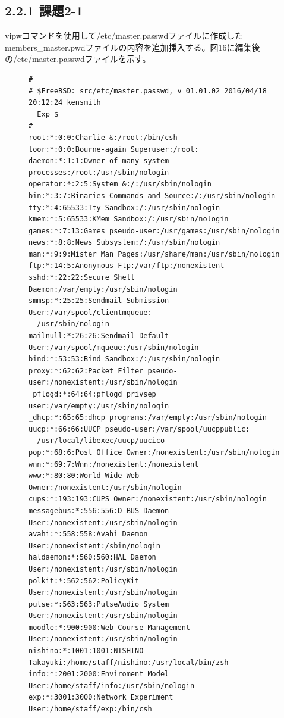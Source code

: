 \documentclass[12pt]{jreport}
\begin{document}
            \subsection*{2.2.1 課題2-1}
                vipwコマンドを使用して/etc/master.passwdファイルに作成したmembers\_master.pwdファイルの内容を追加挿入する。図16に編集後の/etc/master.passwdファイルを示す。
                \begin{figure}[H]
                    \begin{center}
                        \begin{screen}
                            \begin{verbatim}
#
# $FreeBSD: src/etc/master.passwd, v 01.01.02 2016/04/18 20:12:24 kensmith
  Exp $
#
root:*:0:0:Charlie &:/root:/bin/csh
toor:*:0:0:Bourne-again Superuser:/root:
daemon:*:1:1:Owner of many system processes:/root:/usr/sbin/nologin
operator:*:2:5:System &:/:/usr/sbin/nologin
bin:*:3:7:Binaries Commands and Source:/:/usr/sbin/nologin
tty:*:4:65533:Tty Sandbox:/:/usr/sbin/nologin
kmem:*:5:65533:KMem Sandbox:/:/usr/sbin/nologin
games:*:7:13:Games pseudo-user:/usr/games:/usr/sbin/nologin
news:*:8:8:News Subsystem:/:/usr/sbin/nologin
man:*:9:9:Mister Man Pages:/usr/share/man:/usr/sbin/nologin
ftp:*:14:5:Anonymous Ftp:/var/ftp:/nonexistent
sshd:*:22:22:Secure Shell Daemon:/var/empty:/usr/sbin/nologin
smmsp:*:25:25:Sendmail Submission User:/var/spool/clientmqueue:
  /usr/sbin/nologin
mailnull:*:26:26:Sendmail Default User:/var/spool/mqueue:/usr/sbin/nologin
bind:*:53:53:Bind Sandbox:/:/usr/sbin/nologin
proxy:*:62:62:Packet Filter pseudo-user:/nonexistent:/usr/sbin/nologin
_pflogd:*:64:64:pflogd privsep user:/var/empty:/usr/sbin/nologin
_dhcp:*:65:65:dhcp programs:/var/empty:/usr/sbin/nologin
uucp:*:66:66:UUCP pseudo-user:/var/spool/uucppublic:
  /usr/local/libexec/uucp/uucico
pop:*:68:6:Post Office Owner:/nonexistent:/usr/sbin/nologin
wnn:*:69:7:Wnn:/nonexistent:/nonexistent
www:*:80:80:World Wide Web Owner:/nonexistent:/usr/sbin/nologin
cups:*:193:193:CUPS Owner:/nonexistent:/usr/sbin/nologin
messagebus:*:556:556:D-BUS Daemon User:/nonexistent:/usr/sbin/nologin
avahi:*:558:558:Avahi Daemon User:/nonexistent:/sbin/nologin
haldaemon:*:560:560:HAL Daemon User:/nonexistent:/usr/sbin/nologin
polkit:*:562:562:PolicyKit User:/nonexistent:/usr/sbin/nologin
pulse:*:563:563:PulseAudio System User:/nonexistent:/usr/sbin/nologin
moodle:*:900:900:Web Course Management User:/nonexistent:/usr/sbin/nologin
nishino:*:1001:1001:NISHINO Takayuki:/home/staff/nishino:/usr/local/bin/zsh
info:*:2001:2000:Enviroment Model User:/home/staff/info:/usr/sbin/nologin
exp:*:3001:3000:Network Experiment User:/home/staff/exp:/bin/csh
                            \end{verbatim}
                        \end{screen}
                    \end{center}
                \end{figure}
\end{document}
